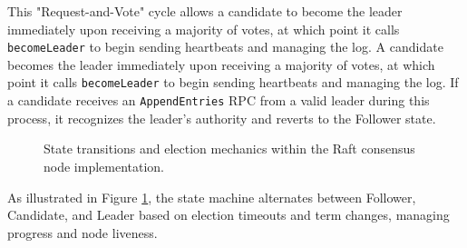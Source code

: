 This "Request-and-Vote" cycle allows a candidate to become the leader immediately upon receiving a majority of votes, at which point it calls \texttt{becomeLeader} to begin sending heartbeats and managing the log. A candidate becomes the leader immediately upon receiving a majority of votes, at which point it calls \texttt{becomeLeader} to begin sending heartbeats and managing the log. If a candidate receives an \texttt{AppendEntries} RPC from a valid leader during this process, it recognizes the leader's authority and reverts to the Follower state.

\begin{figure}[htbp]
    \centering
    \caption{State transitions and election mechanics within the Raft consensus node implementation.}
    \label{fig:raft_states}
\end{figure}

As illustrated in Figure \ref{fig:raft_states}, the state machine alternates between Follower, Candidate, and Leader based on election timeouts and term changes, managing progress and node liveness.

